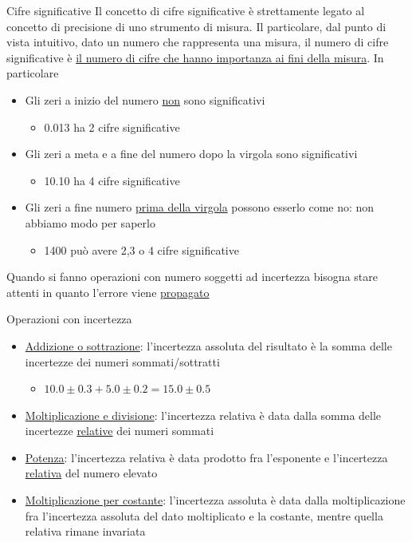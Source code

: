\begin{definizione}{Cifre significative}
	Il concetto di cifre significative è strettamente legato al concetto di precisione di uno strumento di misura. Il particolare, dal punto di vista intuitivo, dato un numero che rappresenta una misura, il numero di cifre significative è \underline{il numero di cifre che hanno importanza ai fini della misura}. In particolare
	\begin{itemize}
		\item Gli zeri a inizio del numero \underline{non} sono significativi
		      \begin{itemize}
			      \item 0.013 ha 2 cifre significative
		      \end{itemize}
		\item Gli zeri a meta e a fine del numero dopo la virgola sono significativi
		      \begin{itemize}
			      \item 10.10 ha 4 cifre significative
		      \end{itemize}
		\item Gli zeri a fine numero \underline{prima della virgola} possono esserlo come no: non abbiamo modo per saperlo
		      \begin{itemize}
			      \item 1400 può avere 2,3 o 4 cifre significative
		      \end{itemize}
	\end{itemize}
\end{definizione}
Quando si fanno operazioni con numero soggetti ad incertezza bisogna stare attenti in quanto l'errore viene \underline{propagato}
\begin{definizione}{Operazioni con incertezza}
	\begin{itemize}
		\item \underline{Addizione o sottrazione}: l'incertezza assoluta del risultato è la somma delle incertezze dei numeri sommati/sottratti
		      \begin{itemize}
			      \item $ 10.0 \pm 0.3 + 5.0 \pm 0.2 = 15.0 \pm 0.5$
		      \end{itemize}
		\item \underline{Moltiplicazione e divisione}: l'incertezza relativa è data dalla somma delle incertezze \underline{relative} dei numeri sommati
		\item \underline{Potenza}: l'incertezza relativa è data prodotto fra l'esponente e l'incertezza \underline{relativa} del numero elevato
		\item \underline{Moltiplicazione per costante}: l'incertezza assoluta è data dalla moltiplicazione fra l'incertezza assoluta del dato moltiplicato e la costante, mentre quella relativa rimane invariata
	\end{itemize}
\end{definizione}
